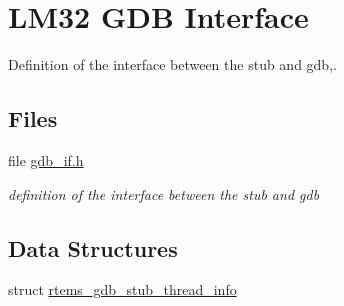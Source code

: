\hypertarget{group__lm32__gdb}{}\section{L\+M32 G\+DB Interface}
\label{group__lm32__gdb}


Definition of the interface between the stub and gdb,.  


\subsection*{Files}
\begin{DoxyCompactItemize}
\item 
file \mbox{\hyperlink{lm32_2shared_2gdbstub_2gdb__if_8h}{gdb\+\_\+if.\+h}}
\begin{DoxyCompactList}\small\item\em definition of the interface between the stub and gdb \end{DoxyCompactList}\end{DoxyCompactItemize}
\subsection*{Data Structures}
\begin{DoxyCompactItemize}
\item 
struct \mbox{\hyperlink{structrtems__gdb__stub__thread__info}{rtems\+\_\+gdb\+\_\+stub\+\_\+thread\+\_\+info}}
\end{DoxyCompactItemize}
